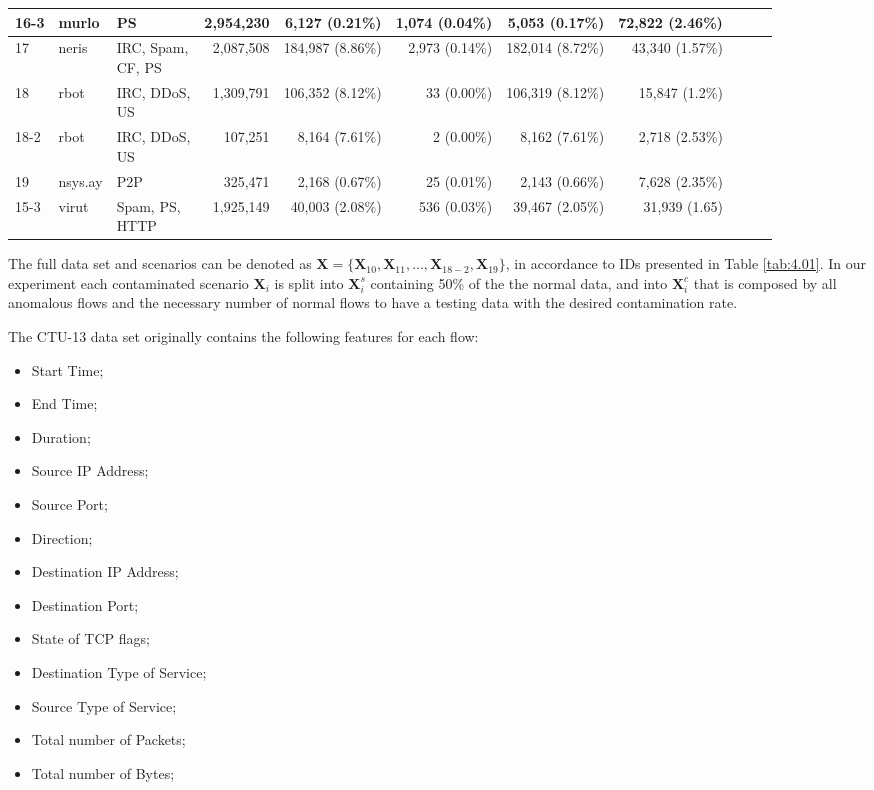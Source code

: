 \begin{table}[h!]
\begin{tabular}{| l | l | l | r | r | r | r | r | r | r | r | }
			16-3 & murlo &PS & 2,954,230 & 6,127 (0.21\%) & 1,074 (0.04\%) & 5,053 (0.17\%) &72,822 (2.46\%)\\ \hline
			17 & neris &\makecell[l]{IRC, Spam,\\CF, PS} & 2,087,508 & 184,987 (8.86\%) & 2,973 (0.14\%) & 182,014 (8.72\%) &43,340 (1.57\%)\\ \hline
			18 & rbot &\makecell[l]{IRC, DDoS,\\US} & 1,309,791 & 106,352 (8.12\%) & 33 (0.00\%) & 106,319 (8.12\%) &15,847 (1.2\%)\\ \hline
			18-2 & rbot &\makecell[l]{IRC, DDoS,\\US} & 107,251 & 8,164 (7.61\%) & 2 (0.00\%) & 8,162 (7.61\%) &2,718 (2.53\%)\\ \hline
			19 & nsys.ay &P2P & 325,471 & 2,168 (0.67\%) & 25 (0.01\%) & 2,143 (0.66\%) &7,628 (2.35\%)\\ \hline
			15-3 & virut &\makecell[l]{Spam, PS,\\HTTP} & 1,925,149 & 40,003 (2.08\%) & 536 (0.03\%) & 39,467 (2.05\%) &31,939 (1.65)\\ \hline
	\end{tabular}
\end{table}

The full data set and scenarios can be denoted as $\pmb{X} = \{\pmb{X}_{10}, \pmb{X}_{11}, \ldots , \pmb{X}_{18-2}, \pmb{X}_{19}\}$, in accordance to IDs presented in Table \ref{tab:4.01}. In our experiment each contaminated scenario $\pmb{X}_i$ is split into $\pmb{X}_i^s$ containing 50\% of the the normal data, and into $\pmb{X}_i^c$ that is composed by all anomalous flows and the necessary number of normal flows to have a testing data with the desired contamination rate.

The CTU-13 data set originally contains the following features for each flow:  

\begin{itemize}
	\item Start Time;
	\item End Time;
	\item Duration;
	\item Source IP Address;
	\item Source Port;
	\item Direction;
	\item Destination IP Address;
	\item Destination Port;
	\item State of TCP flags;
	\item Destination Type of Service;
	\item Source Type of Service;
	\item Total number of Packets;
	\item Total number of Bytes;
\end{itemize}

